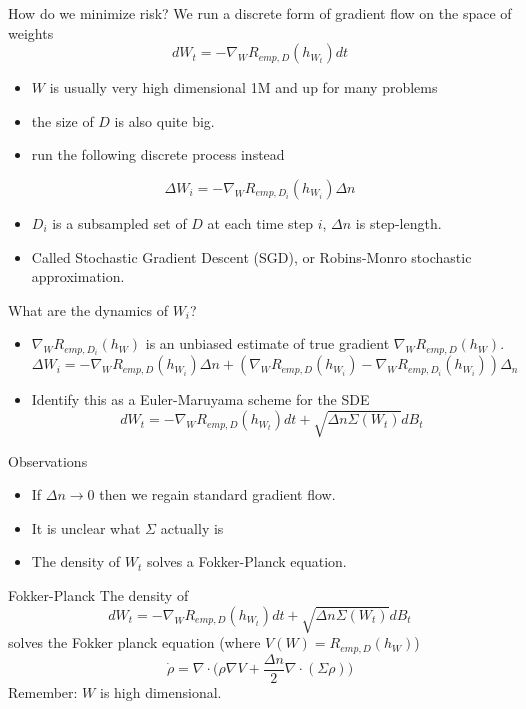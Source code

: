 \documentclass[10pt,handout]{beamer}
\begin{document}
\begin{frame}{How do we minimize risk?}
	We run a discrete form of gradient flow on the space of weights
	$$
		dW_t = -\nabla_W R_{emp,D}(h_{W_t})dt
	$$
	\begin{itemize}
		\item $W$ is usually very high dimensional 1M and up for many problems
		\item the size of $D$ is also quite big.
		\item run the following discrete process instead
	\end{itemize}
	$$
		\Delta W_i = -\nabla_W R_{emp,D_i}(h_{W_i})\Delta n
	$$
	\begin{itemize}
		\item $D_i$ is a subsampled set of $D$ at each time step $i$, $\Delta n$ is step-length. 
		\item Called Stochastic Gradient Descent (SGD), or Robins-Monro stochastic approximation.
	\end{itemize}
\end{frame}

\begin{frame}{What are the dynamics of $W_i$?}
	\begin{itemize}
		\item $\nabla_W R_{emp,D_i}(h_W)$ is an unbiased estimate of true gradient $\nabla_W R_{emp,D}(h_W)$.
		$$
			\Delta W_i = -\nabla_W R_{emp,D}(h_{W_i})\Delta n + (\nabla_W R_{emp,D}(h_{W_i})-\nabla_W R_{emp,D_i}(h_{W_i}))\Delta_n
		$$
		\item Identify this as a Euler-Maruyama scheme for the SDE
		$$
			dW_t = -\nabla_W R_{emp,D}(h_{W_t})dt + \sqrt{\Delta n \Sigma(W_t)} dB_t
		$$
	\end{itemize}
	Observations
	\begin{itemize}
		\item If $\Delta n \to 0$ then we regain standard gradient flow.
		\item It is unclear what $\Sigma$ actually is
		\item The density of $W_t$ solves a Fokker-Planck equation.
	\end{itemize}
\end{frame}

\begin{frame}{Fokker-Planck}
	The density of
	$$
		dW_t = -\nabla_W R_{emp,D}(h_{W_t})dt + \sqrt{\Delta n \Sigma(W_t)} dB_t
	$$
	solves the Fokker planck equation (where $V(W) = R_{emp,D}(h_{W})$)
	$$
		\dot{\rho} = \nabla \cdot \bigg (\rho \nabla V + \frac{\Delta n}{2}\nabla \cdot (\Sigma \rho) \bigg )
	$$
	Remember: $W$ is high dimensional.
\end{frame}
\end{document}
